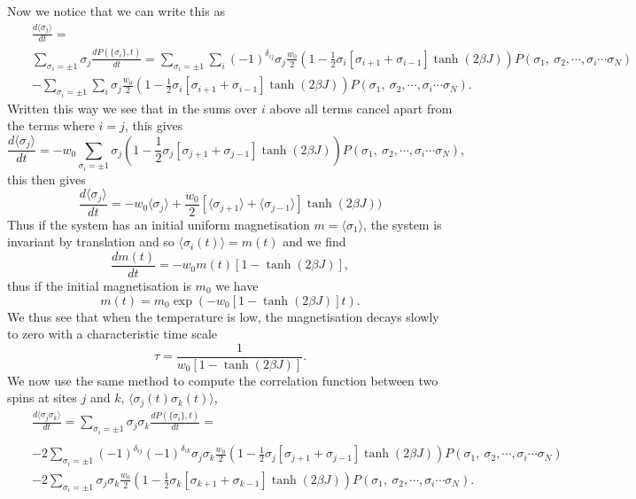 \documentclass[11pt]{report}
\begin{document}
Now we notice that we can write this as 
\begin{eqnarray}
&&\frac{d\langle \sigma_j\rangle }{dt}=\\ &&\sum_{\sigma_i=\pm 1}\sigma_j\frac{dP(\{\sigma_i\},t)}{dt} = \sum_{\sigma_i=\pm1}\sum_i (-1)^{\delta_{ij}}\sigma_j\frac{w_0}{2}(1-  \frac{1}{2}\sigma_i[\sigma_{i+1}+\sigma_{i-1}]\tanh(2\beta J))P(\sigma_1,\ \sigma_2,\cdots, \sigma_i\cdots \sigma_N) \\
&&-\sum_{\sigma_i=\pm1}\sum_i \sigma_j\frac{w_0}{2}(1-  \frac{1}{2}\sigma_i[\sigma_{i+1}+\sigma_{i-1}]\tanh(2\beta J))P(\sigma_1,\ \sigma_2,\cdots, \sigma_i\cdots \sigma_N).
\end{eqnarray}
Written this way we see that in the sums over $i$ above all terms cancel apart from the terms where $i=j$, this gives
\begin{equation}
\frac{d\langle \sigma_j\rangle }{dt} = -w_0\sum_{\sigma_i=\pm1}\sigma_j(1-  \frac{1}{2}\sigma_j[\sigma_{j+1}+\sigma_{j-1}]\tanh(2\beta J))P(\sigma_1,\ \sigma_2,\cdots, \sigma_i\cdots \sigma_N),
\end{equation}
this then gives
\begin{equation}
\frac{d\langle \sigma_j\rangle }{dt} = -w_0\langle \sigma_j\rangle+ \frac{w_0}{2}[\langle \sigma_{j+1}\rangle +\langle\sigma_{j-1}\rangle ]\tanh(2\beta J))
\end{equation}
Thus if the system has an initial uniform magnetisation $m=\langle \sigma_1\rangle$, the system is invariant by translation and so $\langle \sigma_i(t)\rangle =m(t)$ and we find
\begin{equation}
\frac{dm(t) }{dt} = -w_0m(t)[1-\tanh(2\beta J)],
\end{equation}
thus if the initial magnetisation is $m_0$ we have
\begin{equation}
m(t) = m_0 \exp(-w_0[1-\tanh(2\beta J)]t).
\end{equation}
We thus see that when the temperature is low, the magnetisation decays
slowly to zero with a characteristic time scale
\begin{equation}
\tau = \frac{1}{w_0[1-\tanh(2\beta J)]}.
\end{equation}
We now use the same method to compute the correlation function between two spins at sites $j$ and $k$, $\langle \sigma_j(t)\sigma_k(t)\rangle$,
\begin{eqnarray}
&&\frac{d\langle \sigma_j\sigma_k\rangle }{dt}=\sum_{\sigma_i=\pm 1}\sigma_j\sigma_k\frac{dP(\{\sigma_i\},t)}{dt}=\\ &&  \\
&&-2\sum_{\sigma_i=\pm1} (-1)^{\delta_{ij}}(-1)^{\delta_{ik}}\sigma_j\sigma_k\frac{w_0}{2}(1-  \frac{1}{2}\sigma_j[\sigma_{j+1}+\sigma_{j-1}]\tanh(2\beta J))P(\sigma_1,\ \sigma_2,\cdots, \sigma_i\cdots \sigma_N)\\
&&-2\sum_{\sigma_i=\pm1} \sigma_j\sigma_k\frac{w_0}{2}(1-  \frac{1}{2}\sigma_k[\sigma_{k+1}+\sigma_{k-1}]\tanh(2\beta J))P(\sigma_1,\ \sigma_2,\cdots, \sigma_i\cdots \sigma_N).
\end{eqnarray}
\end{document}
